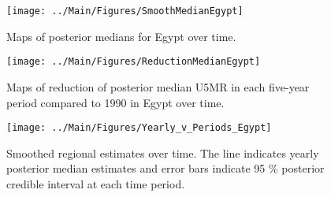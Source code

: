 \documentclass[12pt]{article}\usepackage[]{graphicx}\usepackage[]{color}
\newenvironment{knitrout}{}{} %
\begin{document}
\begin{knitrout}
\color{fgcolor}\begin{figure}[bht]

{\centering \texttt{[image: ../Main/Figures/SmoothMedianEgypt]} 

}

\caption[Maps of posterior medians for Egypt  over time]{Maps of posterior medians for Egypt  over time.}\label{fig:unnamed-chunk-104}
\end{figure}


\end{knitrout}
\begin{knitrout}
\color{fgcolor}\begin{figure}[bht]

{\centering \texttt{[image: ../Main/Figures/ReductionMedianEgypt]} 

}

\caption[Maps of reduction of posterior median U5MR in each five-year period compared to 1990 in Egypt over time]{Maps of reduction of posterior median U5MR in each five-year period compared to 1990 in Egypt over time.}\label{fig:unnamed-chunk-105}
\end{figure}


\end{knitrout}
\begin{knitrout}
\color{fgcolor}\begin{figure}[bht]

{\centering \texttt{[image: ../Main/Figures/Yearly\_v\_Periods\_Egypt]} 

}

\caption[Smoothed regional estimates over time]{Smoothed regional estimates over time. The line indicates yearly posterior median estimates and error bars indicate 95 \% posterior credible interval at each time period.}\label{fig:unnamed-chunk-106}
\end{figure}


\end{knitrout}
\end{document}
